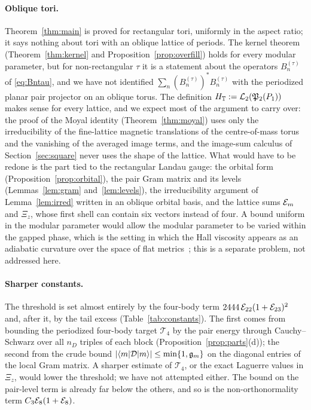 \paragraph{Oblique tori.} Theorem~\ref{thm:main} is proved for rectangular tori, uniformly in the aspect ratio; it says nothing
about tori with an oblique lattice of periods. The kernel theorem (Theorem~\ref{thm:kernel} and Proposition~\ref{prop:overfill})
holds for every modular parameter, but for non-rectangular $\tau$ it is a statement about the operators $B^{(\tau)}_n$ of
\eqref{eq:Bntau}, and we have not identified $\sum_n(B_n^{(\tau)})^*B_n^{(\tau)}$ with the periodized planar pair projector on an oblique
torus. The definition $H_{\mathbb{T}}:=\mathcal{L}_2(\mathfrak{P}_2(P_1))$ makes sense for every lattice, and we expect most of the argument to carry over: the
proof of the Moyal identity (Theorem~\ref{thm:moyal}) uses only the irreducibility of the fine-lattice magnetic translations of
the centre-of-mass torus and the vanishing of the averaged image terms, and the image-sum calculus of Section~\ref{sec:square}
never uses the shape of the lattice. What would have to be redone is the part tied to the rectangular Landau gauge: the orbital
form (Proposition~\ref{prop:orbital}), the pair Gram matrix and its levels (Lemmas~\ref{lem:gram} and~\ref{lem:levels}), the
irreducibility argument of Lemma~\ref{lem:irred} written in an oblique orbital basis, and the lattice sums $\mathcal{E}_m$ and $\Xi_z$, whose
first shell can contain six vectors instead of four. A bound uniform in the modular parameter would allow the modular parameter to
be varied within the gapped phase, which is the setting in which the Hall viscosity appears as an adiabatic curvature over the
space of flat metrics~\cite{ASZ,Read09}; this is a separate problem, not addressed here.

\paragraph{Sharper constants.} The threshold is set almost entirely by the four-body term $2444\,\mathcal{E}_{22}(1+\mathcal{E}_{23})^2$ and, after
it, by the tail excess (Table~\ref{tab:constants}). The first comes from bounding the periodized four-body target $\mathcal T_4$ by
the pair energy through Cauchy--Schwarz over all $n_D$ triples of each block (Proposition~\ref{prop:parts}(d)); the second from the
crude bound $\lvert\langle m\rvert\mathcal{D}\lvert m\rangle\rvert\le\min\{1,\mathfrak g_m\}$ on the diagonal entries of the local Gram matrix. A sharper estimate of
$\mathcal T_4$, or the exact Laguerre values in $\Xi_z$, would lower the threshold; we have not attempted either. The bound on the
pair-level term is already far below the others, and so is the non-orthonormality term $C_{3}\mathcal{E}_8(1+\mathcal{E}_8)$.

